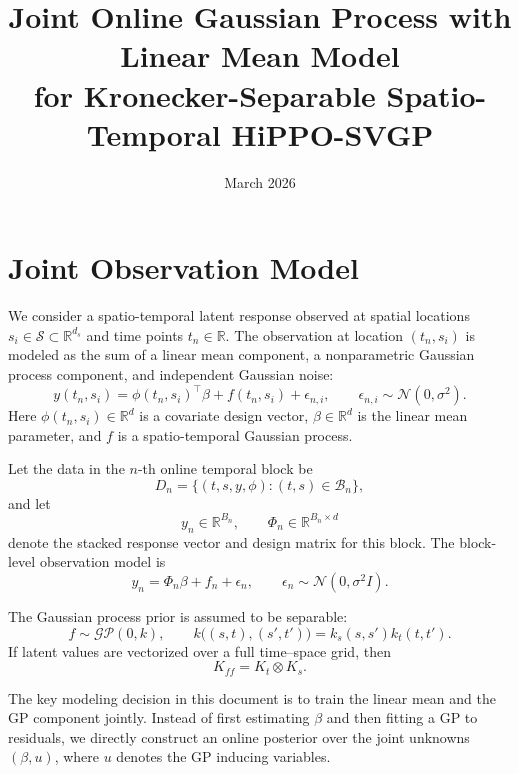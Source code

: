 \documentclass[12pt]{article}
\title{Joint Online Gaussian Process with Linear Mean Model\\
for Kronecker-Separable Spatio-Temporal HiPPO-SVGP}
\author{}
\date{March 2026}
\begin{document}
\maketitle

\section{Joint Observation Model}

We consider a spatio-temporal latent response observed at spatial locations
$s_i\in\mathcal{S}\subset\mathbb{R}^{d_s}$ and time points $t_n\in\mathbb{R}$.
The observation at location $(t_n,s_i)$ is modeled as the sum of a linear mean
component, a nonparametric Gaussian process component, and independent Gaussian noise:
\begin{equation}
y(t_n,s_i)
=
\phi(t_n,s_i)^\top \beta
+
f(t_n,s_i)
+
\epsilon_{n,i},
\qquad
\epsilon_{n,i}\sim\mathcal{N}(0,\sigma^2).
\label{eq:joint-observation-scalar}
\end{equation}
Here $\phi(t_n,s_i)\in\mathbb{R}^{d}$ is a covariate design vector,
$\beta\in\mathbb{R}^{d}$ is the linear mean parameter, and
$f$ is a spatio-temporal Gaussian process.

Let the data in the $n$-th online temporal block be
\begin{equation}
D_n=\{(t,s,y,\phi): (t,s)\in\mathcal{B}_n\},
\end{equation}
and let
\begin{equation}
y_n\in\mathbb{R}^{B_n},
\qquad
\Phi_n\in\mathbb{R}^{B_n\times d}
\end{equation}
denote the stacked response vector and design matrix for this block. The block-level
observation model is
\begin{equation}
y_n = \Phi_n \beta + f_n + \epsilon_n,
\qquad
\epsilon_n\sim\mathcal{N}(0,\sigma^2 I).
\label{eq:block-observation}
\end{equation}

The Gaussian process prior is assumed to be separable:
\begin{equation}
f\sim \mathcal{GP}(0,k),
\qquad
k\big((s,t),(s',t')\big)
=
k_s(s,s')k_t(t,t').
\label{eq:separable-kernel}
\end{equation}
If latent values are vectorized over a full time--space grid, then
\begin{equation}
K_{ff}=K_t\otimes K_s.
\label{eq:full-kron-prior}
\end{equation}

The key modeling decision in this document is to train the linear mean and the GP
component jointly. Instead of first estimating $\beta$ and then fitting a GP to residuals,
we directly construct an online posterior over the joint unknowns $(\beta,u)$, where
$u$ denotes the GP inducing variables.
\end{document}

